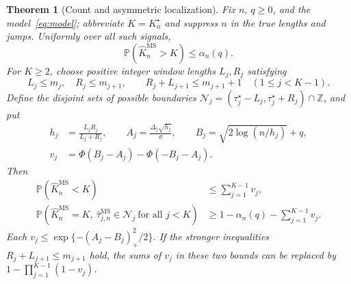 \documentclass[pdflatex,sn-mathphys-num]{sn-jnl}
\newcommand{\Prob}{\mathbb P}
\newcommand{\Z}{\mathbb Z}
\newcommand{\taus}{\tau^\star}
\theoremstyle{thmstyleone}
\newtheorem{theorem}{Theorem}
\theoremstyle{thmstyletwo}
\begin{document}
\begin{theorem}[Count and asymmetric localization]\label{thm:ms-finite}
Fix $n$, $q\ge0$, and the model~\eqref{eq:model}; abbreviate
$K=K_n^\star$ and suppress $n$ in the true lengths and jumps. Uniformly over
all such signals,
\begin{equation}\label{eq:ms-over}
\Prob(\widehat K_n^{\mathrm{MS}}>K)\le\alpha_n(q).
\end{equation}
For $K\ge2$, choose positive integer window lengths $L_j,R_j$ satisfying
\begin{equation}\label{eq:ms-windows}
L_j\le m_j,\quad R_j\le m_{j+1},\qquad
R_j+L_{j+1}\le m_{j+1}+1\quad(1\le j<K-1).
\end{equation}
Define the disjoint sets of possible boundaries
$\mathcal N_j=(\taus_j-L_j,\taus_j+R_j)\cap\Z$, and put
\begin{align}
h_j&=\frac{L_jR_j}{L_j+R_j},\qquad
A_j=\frac{\Delta_j\sqrt{h_j}}{\sigma},\qquad
B_j=\sqrt{2\log(n/h_j)}+q,\label{eq:ms-AB}\\
v_j&=\Phi(B_j-A_j)-\Phi(-B_j-A_j).
\label{eq:ms-v}
\end{align}
Then
\begin{align}
\Prob(\widehat K_n^{\mathrm{MS}}<K)&\le\sum_{j=1}^{K-1}v_j,
\label{eq:ms-under}\\
\Prob\left(\widehat K_n^{\mathrm{MS}}=K,\
\widehat\tau_{j,n}^{\mathrm{MS}}\in\mathcal N_j\ \text{for all }j<K\right)
&\ge1-\alpha_n(q)-\sum_{j=1}^{K-1}v_j.
\label{eq:ms-recovery}
\end{align}
Each $v_j\le\exp\{-(A_j-B_j)_+^2/2\}$. If the stronger inequalities
$R_j+L_{j+1}\le m_{j+1}$ hold, the sums of $v_j$ in these two bounds
can be replaced by $1-\prod_{j=1}^{K-1}(1-v_j)$.
\end{theorem}
\end{document}
